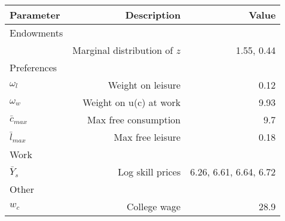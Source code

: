 \begin{tabular}{lrr}
\hline
Parameter & Description  & Value  \\ 
\hline
Endowments &   &   \\ 
 & Marginal distribution of $z$  & 1.55, 0.44  \\ 
Preferences &   &   \\ 
$\omega_{l}$ & Weight on leisure  & 0.12  \\ 
$\omega_{w}$ & Weight on u(c) at work  & 9.93  \\ 
$\bar{c}_{max}$ & Max free consumption  & 9.7  \\ 
$\bar{l}_{max}$ & Max free leisure  & 0.18  \\ 
Work &   &   \\ 
$\bar{Y}_{s}$ & Log skill prices  & 6.26, 6.61, 6.64, 6.72  \\ 
Other &   &   \\ 
$w_{c}$ & College wage  & 28.9  \\ 
\hline
\end{tabular}%
